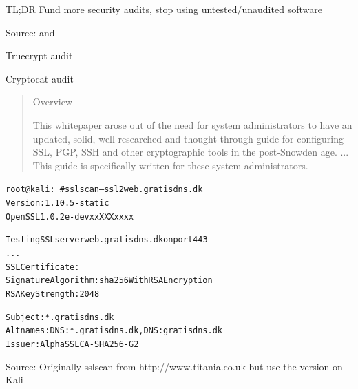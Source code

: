 \documentclass[20pt,landscape,a4paper,footrule]{foils}
\begin{document}
\vskip 2cm

\centerline{TL;DR Fund more security audits, stop using untested/unaudited software}




Source:  and \\


\begin{list1}
\item Truecrypt audit\\
{\footnotesize{}}
\item Cryptocat audit\\
{\footnotesize{}}
\end{list1}




\begin{quote}
Overview

This whitepaper arose out of the need for system administrators to have an updated, solid, well researched and thought-through guide for configuring SSL, PGP, SSH and other cryptographic tools in the post-Snowden age. ... This guide is specifically written for these system administrators.
\end{quote}




\begin{alltt}\small
root@kali:~# sslscan --ssl2 web.gratisdns.dk
Version: 1.10.5-static
OpenSSL 1.0.2e-dev xx XXX xxxx

Testing SSL server web.gratisdns.dk on port 443
...
  SSL Certificate:
Signature Algorithm: sha256WithRSAEncryption
RSA Key Strength:    2048

Subject:  *.gratisdns.dk
Altnames: DNS:*.gratisdns.dk, DNS:gratisdns.dk
Issuer:   AlphaSSL CA - SHA256 - G2
\end{alltt}

Source:
Originally sslscan from http://www.titania.co.uk
 but use the version on Kali
\end{document}
